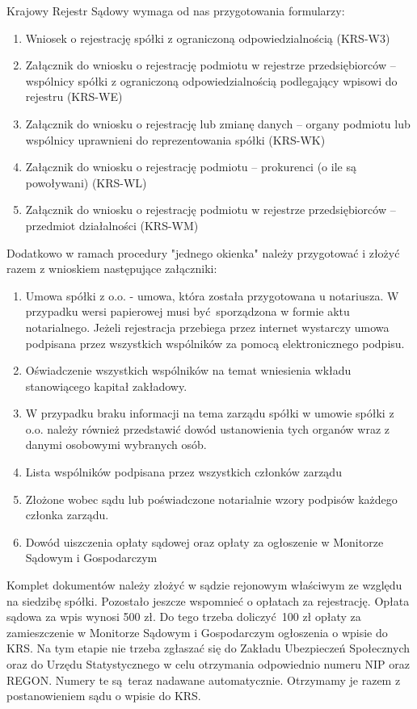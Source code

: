 Krajowy Rejestr Sądowy wymaga od nas przygotowania formularzy:
\begin{enumerate}
	\item Wniosek o rejestrację spółki z ograniczoną odpowiedzialnością (KRS-W3) 
	\item Załącznik do wniosku o rejestrację podmiotu w rejestrze przedsiębiorców – wspólnicy spółki z ograniczoną odpowiedzialnością podlegający wpisowi do rejestru (KRS-WE)
	\item Załącznik do wniosku o rejestrację lub zmianę danych – organy podmiotu lub wspólnicy uprawnieni do reprezentowania spółki (KRS-WK)
	\item Załącznik do wniosku o rejestrację podmiotu – prokurenci (o ile są powoływani) (KRS-WL)
	\item Załącznik do wniosku o rejestrację podmiotu w rejestrze przedsiębiorców – przedmiot działalności (KRS-WM)
\end{enumerate}

Dodatkowo w ramach procedury "jednego okienka" należy przygotować i złożyć razem z wnioskiem następujące załączniki:

\begin{enumerate}
	\item Umowa spółki z o.o. - umowa, która została przygotowana u notariusza. W przypadku wersi papierowej musi być sporządzona w formie aktu notarialnego. Jeżeli rejestracja przebiega przez internet wystarczy umowa podpisana przez wszystkich wspólników za pomocą elektronicznego podpisu.
	\item Oświadczenie wszystkich wspólników na temat wniesienia wkładu stanowiącego kapitał zakładowy.
	\item W przypadku braku informacji na tema zarządu spółki w umowie spółki z o.o. należy również przedstawić dowód ustanowienia tych organów wraz z danymi osobowymi wybranych osób.
	\item Lista wspólników podpisana przez wszystkich członków zarządu
	\item Złożone wobec sądu lub poświadczone notarialnie wzory podpisów każdego członka zarządu.
	\item Dowód uiszczenia opłaty sądowej oraz opłaty za ogłoszenie w Monitorze Sądowym i Gospodarczym 
\end{enumerate}

Komplet dokumentów należy złożyć w sądzie rejonowym właściwym ze względu na siedzibę spółki. Pozostało jeszcze wspomnieć o opłatach za rejestrację. Opłata sądowa za wpis wynosi 500 zł. Do tego trzeba doliczyć 100 zł opłaty za zamieszczenie w Monitorze Sądowym i Gospodarczym ogłoszenia o wpisie do KRS.
Na tym etapie nie trzeba zgłaszać się do Zakładu Ubezpieczeń Społecznych oraz do Urzędu Statystycznego w celu otrzymania odpowiednio numeru NIP oraz REGON. Numery te są teraz nadawane automatycznie. Otrzymamy je razem z postanowieniem sądu o wpisie do KRS.

